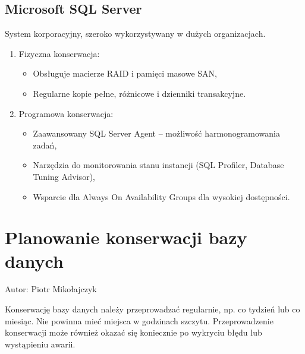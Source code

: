 \documentclass[a4paper,11pt,polish]{sphinxmanual}
\begin{document}
\subsection{Microsoft SQL Server}
\label{\detokenize{Kontrola_i_konserwacja/kontrola_i_konserwacja:microsoft-sql-server}}
\sphinxAtStartPar
System korporacyjny, szeroko wykorzystywany w dużych organizacjach.
\begin{enumerate}
%
\item {} 
\sphinxAtStartPar
Fizyczna konserwacja:
\begin{itemize}
\item {} 
\sphinxAtStartPar
Obsługuje macierze RAID i pamięci masowe SAN,

\item {} 
\sphinxAtStartPar
Regularne kopie pełne, różnicowe i dzienniki transakcyjne.

\end{itemize}

\item {} 
\sphinxAtStartPar
Programowa konserwacja:
\begin{itemize}
\item {} 
\sphinxAtStartPar
Zaawansowany SQL Server Agent – możliwość harmonogramowania zadań,

\item {} 
\sphinxAtStartPar
Narzędzia do monitorowania stanu instancji (SQL Profiler, Database Tuning Advisor),

\item {} 
\sphinxAtStartPar
Wsparcie dla Always On Availability Groups dla wysokiej dostępności.

\end{itemize}

\end{enumerate}


\section{Planowanie konserwacji bazy danych}
\label{\detokenize{Kontrola_i_konserwacja/kontrola_i_konserwacja:planowanie-konserwacji-bazy-danych}}
\sphinxAtStartPar
Autor: Piotr Mikołajczyk

\sphinxAtStartPar
Konserwację bazy danych należy przeprowadzać regularnie, np. co tydzień lub co miesiąc. Nie powinna mieć miejsca w godzinach szczytu. Przeprowadzenie konserwacji może również okazać się koniecznie po wykryciu błędu lub wystąpieniu awarii.
\end{document}
